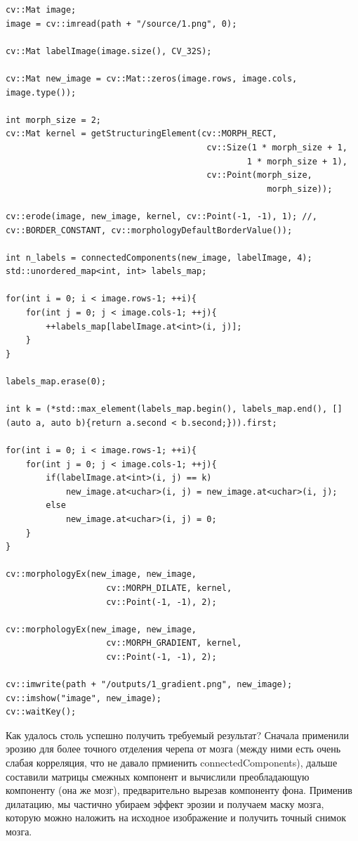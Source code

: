 \begin{lstlisting}[style=cpp_white, caption={Исходный код для отделения мозга от}]
cv::Mat image;
image = cv::imread(path + "/source/1.png", 0);

cv::Mat labelImage(image.size(), CV_32S);

cv::Mat new_image = cv::Mat::zeros(image.rows, image.cols, image.type());

int morph_size = 2; 
cv::Mat kernel = getStructuringElement(cv::MORPH_RECT, 
                                        cv::Size(1 * morph_size + 1, 
                                                1 * morph_size + 1), 
                                        cv::Point(morph_size, 
                                                    morph_size)); 

cv::erode(image, new_image, kernel, cv::Point(-1, -1), 1); //, cv::BORDER_CONSTANT, cv::morphologyDefaultBorderValue());

int n_labels = connectedComponents(new_image, labelImage, 4);
std::unordered_map<int, int> labels_map;

for(int i = 0; i < image.rows-1; ++i){
    for(int j = 0; j < image.cols-1; ++j){
        ++labels_map[labelImage.at<int>(i, j)];
    }
}

labels_map.erase(0);

int k = (*std::max_element(labels_map.begin(), labels_map.end(), [](auto a, auto b){return a.second < b.second;})).first;

for(int i = 0; i < image.rows-1; ++i){
    for(int j = 0; j < image.cols-1; ++j){
        if(labelImage.at<int>(i, j) == k)
            new_image.at<uchar>(i, j) = new_image.at<uchar>(i, j);
        else
            new_image.at<uchar>(i, j) = 0;
    }
}

cv::morphologyEx(new_image, new_image, 
                    cv::MORPH_DILATE, kernel, 
                    cv::Point(-1, -1), 2); 

cv::morphologyEx(new_image, new_image, 
                    cv::MORPH_GRADIENT, kernel, 
                    cv::Point(-1, -1), 2); 

cv::imwrite(path + "/outputs/1_gradient.png", new_image);
cv::imshow("image", new_image);
cv::waitKey();
\end{lstlisting}

Как удалось столь успешно получить требуемый результат? Сначала применили эрозию для более точного отделения черепа от мозга (между ними есть очень слабая корреляция, что не давало прмиенить connectedComponents), 
дальше составили матрицы смежных компонент и вычислили преобладающую компоненту (она же мозг), предварительно вырезав компоненту фона. Применив дилатацию, мы частично убираем эффект эрозии и получаем маску мозга, которую можно наложить на исходное изображение и получить точный снимок мозга.

